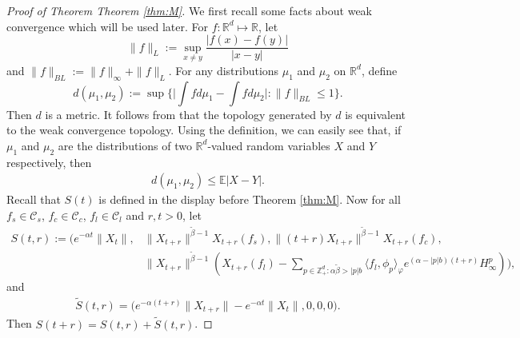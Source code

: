 \documentclass[12pt,a4paper]{amsart}
\theoremstyle{plain}
\theoremstyle{definition}
\numberwithin{equation}{section}
\begin{document}
\begin{proof}[Proof of Theorem Theorem \ref{thm:M}]
 We first recall some facts about weak convergence which will be used later. For $f:\mathbb R^d\mapsto \mathbb R$, let
 $$
 \|f\|_L:=\sup_{x\neq y}\frac{|f(x)-f(y)|}{|x-y|}
 $$
 and $\|f\|_{BL}:= \|f\|_{\infty}+\|f\|_L. $
 For any distributions $\mu_1$ and $\mu_2$ on $\mathbb R^d$, define
\[
  d(\mu_1,\mu_2):=\sup\Big\{\Big|\int fd\mu_1-\int f d\mu_2\Big|:\|f\|_{BL}\leq 1\Big\}.
\]
Then $d$ is a metric. It follows from \cite[Theorem 11.3.3]{Dudley2002} that the topology generated by $d$ is equivalent to the weak convergence topology. Using the definition, we can easily see that, if $\mu_1$ and $\mu_2$ are the distributions of two $\mathbb R^d $-valued random variables $X$ and $Y$ respectively, then
\begin{align}\label{ineq: distribution control}
  d(\mu_1,\mu_2) \leq \mathbb E|X-Y|.
\end{align}
Recall that $S(t)$ is defined in the display before Theorem \ref{thm:M}.
Now for all $f_s\in \mathcal C_s $, $f_c \in \mathcal C_c$, $f_l \in \mathcal C_l$ and
$r,t>0$, let
\begin{align}
  S(t,r):=\Big(e^{-\alpha t}\|X_t\|,& \|X_{t+r}\|^{\tilde{\beta}-1}X_{t+r}(f_s), \|(t+r)X_{t+r}\|^{\tilde{\beta}-1}X_{t+r}(f_c),\\
& \|X_{t+r}\|^{\tilde{\beta}-1}(X_{t+r}(f_l)-\sum_{p\in \mathbb Z_+^d:\alpha\tilde{\beta}>|p|b}\langle f_l,\phi_p\rangle_{\varphi}e^{(\alpha-|p|b)(t+r)}H_{\infty}^p )\Big),
\end{align}
and
\begin{align}
\widetilde{S}(t,r)= \Big(e^{-\alpha (t+r)}\|X_{t+r}\|-e^{-\alpha t}\|X_t\|,0,0,0\Big).
\end{align}
Then $S(t+r)=S(t,r)+\widetilde{S}(t,r)$.


\end{proof}
\end{document}
